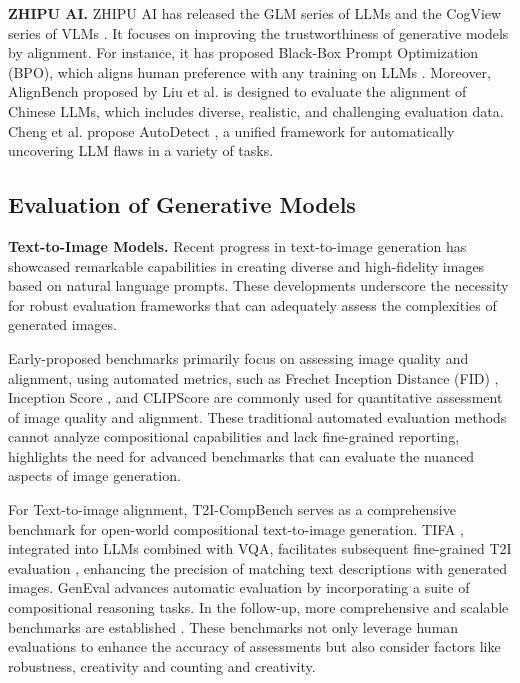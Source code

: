 \textbf{ZHIPU AI.} ZHIPU AI has released the GLM series of LLMs \cite{hou2024chatglm} and the CogView series of VLMs \cite{thudm2024cogview3plus}. It focuses on improving the trustworthiness of generative models by alignment. For instance, it has proposed Black-Box Prompt Optimization (BPO), which aligns human preference with any training on LLMs \cite{cheng2023black}. Moreover, AlignBench \cite{liu2023alignbench} proposed by Liu et al. is designed to evaluate the alignment of Chinese LLMs, which includes diverse, realistic, and challenging evaluation data. Cheng et al. propose AutoDetect \cite{cheng2024autodetect}, a unified framework for automatically uncovering LLM flaws in a variety of tasks.






\subsection{Evaluation of Generative Models}
\label{sec:evaluation_related_work}

\textbf{Text-to-Image Models.} Recent progress in text-to-image generation \cite{rombach2022high,ramesh2024dalle3} has showcased remarkable capabilities in creating diverse and high-fidelity images based on natural language prompts. These developments underscore the necessity for robust evaluation frameworks that can adequately assess the complexities of generated images.

Early-proposed benchmarks \cite{lin2014microsoft,krizhevsky2017imagenet} primarily focus on assessing image quality and alignment, using automated metrics, such as Frechet Inception Distance (FID) \cite{heusel2017gans}, Inception Score \cite{salimans2016improved}, and CLIPScore \cite{hessel2021clipscore} are commonly used for quantitative assessment of image quality and alignment. These traditional automated evaluation methods cannot analyze compositional capabilities and lack fine-grained reporting, highlights the need for advanced benchmarks that can evaluate the nuanced aspects of image generation.

For Text-to-image alignment, T2I-CompBench \cite{huang2023t2i} serves as a comprehensive benchmark for open-world compositional text-to-image generation. TIFA \cite{hu2023tifa}, integrated into LLMs combined with VQA, facilitates subsequent fine-grained T2I evaluation \cite{cho2023davidsonian, yarom2024you}, enhancing the precision of matching text descriptions with generated images. GenEval \cite{ghosh2024geneval} advances automatic evaluation by incorporating a suite of compositional reasoning tasks. In the follow-up, more comprehensive and scalable benchmarks are established \cite{bakr2023hrs,lee2024holistic,li2024evaluating,lin2024evaluating}. These benchmarks not only leverage human evaluations to enhance the accuracy of assessments but also consider factors like robustness, creativity and counting and creativity. 

